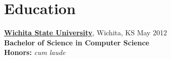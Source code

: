 \documentclass[10pt]{article}       %
\begin{document}


\vspace{-16.5pt}


\section*{Education}
\textbf{\href{https://www.wichita.edu}{Wichita State University}}, Wichita, KS \hfill May 2012 \\
\vspace{1pt}
\textbf{Bachelor of Science in Computer Science} \\
\vspace{1pt}
\textbf{Honors:} \textit{cum laude} \\


\end{document}

